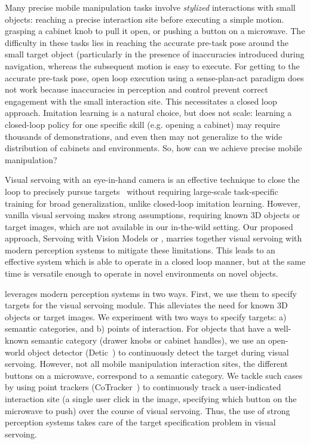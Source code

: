 Many precise mobile manipulation tasks involve {\it stylized} interactions with small objects: reaching a precise interaction site before executing a simple motion. 
 grasping a cabinet knob to pull it open, or pushing a button on a microwave.
The difficulty in these tasks lies in reaching the accurate pre-task pose around the small target object (particularly in the presence of inaccuracies introduced during navigation, 
whereas the subsequent motion is easy to execute.
For getting to the accurate pre-task pose, open loop execution using a sense-plan-act
paradigm does not work because inaccuracies in perception and control prevent
correct engagement with the small interaction site. 
This necessitates a closed loop approach. Imitation learning is a natural choice, but
does not scale: learning a closed-loop policy for one specific skill (e.g. opening a cabinet) may require thousands of demonstrations, and even then may not generalize to the wide distribution of cabinets and environments.
So, how can we achieve precise mobile manipulation?






Visual servoing with an eye-in-hand camera is an effective
technique to close the loop to precisely pursue
targets~\cite{chaumette2016visual}
without requiring large-scale task-specific training for broad generalization, 
unlike closed-loop imitation learning.
However, vanilla visual servoing makes
strong assumptions, \eg requiring known 3D objects or target images, which are
not available in our in-the-wild setting. Our proposed approach, Servoing with 
Vision Models or \name, marries together
visual servoing with modern perception systems to mitigate these limitations.
This leads to an effective system which is able to operate in a closed loop
manner, but at the same time is versatile enough to operate in novel
environments on novel objects.

\name leverages modern perception systems in two ways. First, we use them to
specify targets for the visual servoing module. This alleviates the need for
known 3D objects or target images. We experiment with two ways to specify
targets: a) semantic categories, and b) points of interaction. For objects that
have a well-known semantic category (\eg drawer knobs or cabinet handles), we
use an open-world object detector (\eg Detic~\cite{zhou2022detecting}) to
continuously detect the target during visual servoing. However, not all mobile manipulation interaction sites, \eg the different buttons on a microwave, correspond to a semantic
category. We tackle such cases by using point trackers (\eg CoTracker~\cite{karaev2023cotracker}) to continuously track a user-indicated interaction site (\eg a single user click in the image, specifying which button on the microwave to push) over the course of visual servoing. Thus, the use of strong perception systems takes care of the target specification problem in visual servoing.

